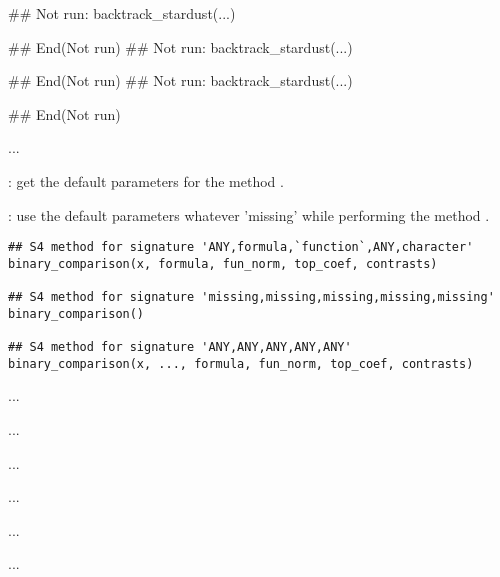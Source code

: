 \documentclass[letterpaper]{book}
\begin{document}
%
\begin{SeeAlso}\relax
{}
\end{SeeAlso}
%
\begin{Examples}
\begin{ExampleCode}
## Not run: 
backtrack_stardust(...)

## End(Not run)
## Not run: 
backtrack_stardust(...)

## End(Not run)
## Not run: 
backtrack_stardust(...)

## End(Not run)
\end{ExampleCode}
\end{Examples}
%
\begin{Description}\relax
...

: get the default parameters for the method
.

: use the default parameters whatever 'missing'
while performing the method .
\end{Description}
%
\begin{Usage}
\begin{verbatim}
## S4 method for signature 'ANY,formula,`function`,ANY,character'
binary_comparison(x, formula, fun_norm, top_coef, contrasts)

## S4 method for signature 'missing,missing,missing,missing,missing'
binary_comparison()

## S4 method for signature 'ANY,ANY,ANY,ANY,ANY'
binary_comparison(x, ..., formula, fun_norm, top_coef, contrasts)
\end{verbatim}
\end{Usage}
%
\begin{Arguments}
\begin{ldescription}
\item[\code{x}] ...

\item[\code{formula}] ...

\item[\code{fun\_norm}] ...

\item[\code{top\_coef}] ...

\item[\code{contrasts}] ...

\item[\code{...}] ...
\end{ldescription}
\end{Arguments}
\end{document}
